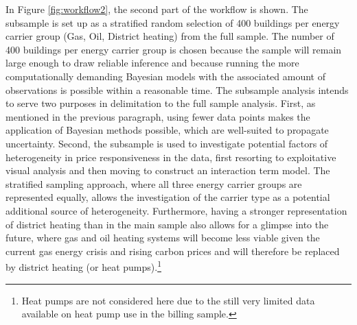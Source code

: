 \documentclass[12pt,twoside]{reedthesis}
\begin{document}
In Figure \ref{fig:workflow2}, the second part of the workflow is shown. The subsample is set up as a stratified random selection of 400 buildings per energy carrier group (Gas, Oil, District heating) from the full sample. The number of 400 buildings per energy carrier group is chosen because the sample will remain large enough to draw reliable inference and because running the more computationally demanding Bayesian models with the associated amount of observations is possible within a reasonable time. The subsample analysis intends to serve two purposes in delimitation to the full sample analysis. First, as mentioned in the previous paragraph, using fewer data points makes the application of Bayesian methods possible, which are well-suited to propagate uncertainty. Second, the subsample is used to investigate potential factors of heterogeneity in price responsiveness in the data, first resorting to exploitative visual analysis and then moving to construct an interaction term model. The stratified sampling approach, where all three energy carrier groups are represented equally, allows the investigation of the carrier type as a potential additional source of heterogeneity. Furthermore, having a stronger representation of district heating than in the main sample also allows for a glimpse into the future, where gas and oil heating systems will become less viable given the current gas energy crisis and rising carbon prices and will therefore be replaced by district heating (or heat pumps).\footnote{Heat pumps are not considered here due to the still very limited data available on heat pump use in the billing sample.}
\end{document}
